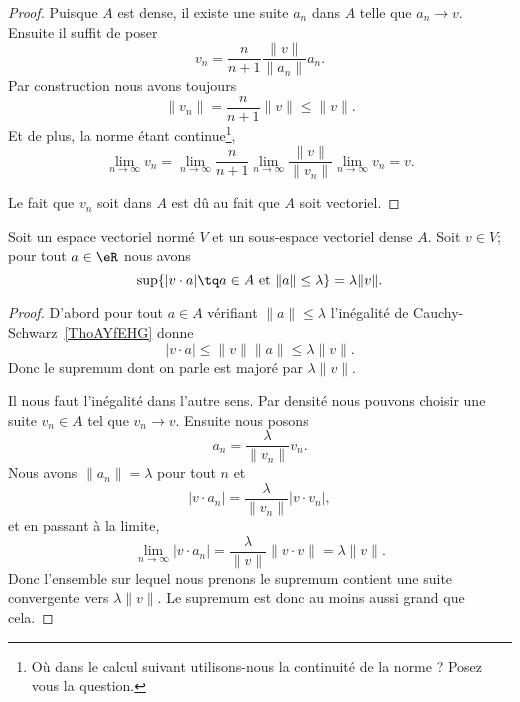 \begin{proof}
    Puisque \( A\) est dense, il existe une suite \( a_n\) dans \( A\) telle que \( a_n\to v\). Ensuite il suffit de poser
    \begin{equation}
        v_n=\frac{ n }{ n+1 }\frac{ \| v \| }{ \| a_n \| }a_n.
    \end{equation}
    Par construction nous avons toujours
    \begin{equation}
        \| v_n \|=\frac{ n }{ n+1 }\| v \|\leq \| v \|.
    \end{equation}
    Et de plus, la norme étant continue\footnote{Où dans le calcul suivant utilisons-nous la continuité de la norme ? Posez vous la question.},
    \begin{equation}
        \lim_{n\to \infty} v_n=\lim_{n\to \infty} \frac{ n }{ n+1 }\lim_{n\to \infty} \frac{ \| v \| }{ \| v_n \| }\lim_{n\to \infty} v_n=v.
    \end{equation}

    Le fait que \( v_n\) soit dans \( A\) est dû au fait que \( A\) soit vectoriel.
\end{proof}

\begin{proposition}     \label{PROPooVEMGooYKhMFy}
    Soit un espace vectoriel normé \( V\) et un sous-espace vectoriel dense \( A\). Soit \( v\in V\); pour tout \( a\in \eR\) nous avons
    \begin{equation}
        \sup\{ | v\cdot a |\tq a\in A\text{ et }\| a \|\leq \lambda \}=\lambda\| v \|.
    \end{equation}
\end{proposition}

\begin{proof}
    D'abord pour tout \( a\in A\) vérifiant \( \| a \|\leq \lambda\) l'inégalité de Cauchy-Schwarz~\ref{ThoAYfEHG} donne
    \begin{equation}
        | v\cdot a |\leq \| v \|\| a \|\leq \lambda\| v \|.
    \end{equation}
    Donc le supremum dont on parle est majoré par \( \lambda\| v \|\).

    Il nous faut l'inégalité dans l'autre sens. Par densité nous pouvons choisir une suite \( v_n\in A\) tel que \( v_n\to v\). Ensuite nous posons
    \begin{equation}
        a_n=\frac{ \lambda }{ \| v_n \| }v_n.
    \end{equation}
    Nous avons \( \| a_n \|=\lambda\) pour tout \( n\) et
    \begin{equation}
        | v\cdot a_n |=\frac{ \lambda }{ \| v_n \| }| v\cdot v_n |,
    \end{equation}
    et en passant à la limite,
    \begin{equation}
        \lim_{n\to \infty} | v\cdot a_n |=\frac{ \lambda }{ \| v \| }\| v\cdot v \|=\lambda\| v \|.
    \end{equation}
    Donc l'ensemble sur lequel nous prenons le supremum contient une suite convergente vers \( \lambda\| v \|\). Le supremum est donc au moins aussi grand que cela.
\end{proof}

